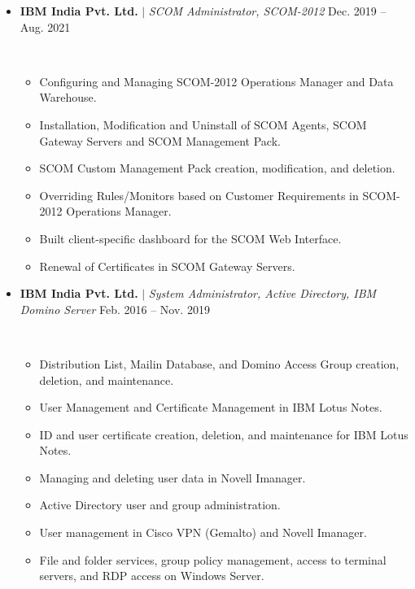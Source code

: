 \documentclass[letterpaper, 12pt]{article}
\begin{document}
\begin{itemize}
\begin{itemize}
			\end{itemize}
			\item {\begin{Large}
					\textbf{IBM India Pvt. Ltd.} $|$ \textit{SCOM Administrator, SCOM-2012}	
					\hfill{Dec. 2019 -- Aug. 2021}\end{Large}}\\
			\vspace*{-0.55cm}
			\begin{itemize}
				\item {Configuring and Managing SCOM-2012 Operations Manager and Data Warehouse.}
				\item {Installation, Modification and Uninstall of SCOM Agents, SCOM Gateway Servers and  SCOM Management Pack.}
				\item {SCOM Custom Management Pack creation, modification, and deletion.}
				\item {Overriding Rules/Monitors based on Customer Requirements in SCOM-2012 Operations Manager.}
				\item {Built client-specific dashboard for the SCOM Web Interface.}
				\item {Renewal of Certificates in SCOM Gateway Servers.}	
			\end{itemize}
			\item {\begin{Large}
					\textbf{IBM India Pvt. Ltd.} $|$ \textit{System Administrator, Active Directory, IBM Domino Server}	
					\hfill{Feb. 2016 -- Nov. 2019}\end{Large}}\\
			\vspace*{-0.55cm}
			\begin{itemize}
				\item{Distribution List, Mailin Database, and Domino Access Group creation, deletion, and maintenance.}
				\item {User Management and Certificate Management in IBM Lotus Notes.}
				\item {ID and user certificate creation, deletion, and maintenance for IBM Lotus Notes.}
				\item {Managing and deleting user data in Novell Imanager.}
				\item {Active Directory user and group administration.}
				\item {User management in Cisco VPN (Gemalto) and Novell Imanager.}
				\item {File and folder services, group policy management, access to terminal servers, and RDP access on Windows Server.}	
				

\end{itemize}
\end{itemize}
\end{document}
